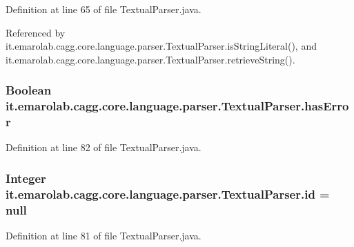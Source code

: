 Definition at line 65 of file Textual\-Parser.\-java.



Referenced by it.\-emarolab.\-cagg.\-core.\-language.\-parser.\-Textual\-Parser.\-is\-String\-Literal(), and it.\-emarolab.\-cagg.\-core.\-language.\-parser.\-Textual\-Parser.\-retrieve\-String().

\hypertarget{classit_1_1emarolab_1_1cagg_1_1core_1_1language_1_1parser_1_1TextualParser_a97db3f1690e531815e0b316e0bf84418}{
\subsubsection[{has\-Error}]{\setlength{\rightskip}{0pt plus 5cm}Boolean it.\-emarolab.\-cagg.\-core.\-language.\-parser.\-Textual\-Parser.\-has\-Error\hspace{0.3cm}{\ttfamily [private]}}}\label{classit_1_1emarolab_1_1cagg_1_1core_1_1language_1_1parser_1_1TextualParser_a97db3f1690e531815e0b316e0bf84418}


Definition at line 82 of file Textual\-Parser.\-java.

\hypertarget{classit_1_1emarolab_1_1cagg_1_1core_1_1language_1_1parser_1_1TextualParser_ad55874c03b0539971ad34a18727399ff}{
\subsubsection[{id}]{\setlength{\rightskip}{0pt plus 5cm}Integer it.\-emarolab.\-cagg.\-core.\-language.\-parser.\-Textual\-Parser.\-id = null\hspace{0.3cm}{\ttfamily [private]}}}\label{classit_1_1emarolab_1_1cagg_1_1core_1_1language_1_1parser_1_1TextualParser_ad55874c03b0539971ad34a18727399ff}


Definition at line 81 of file Textual\-Parser.\-java.



